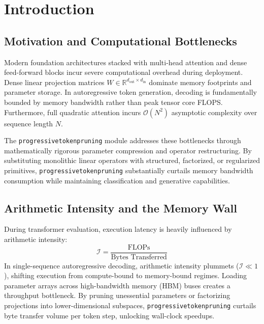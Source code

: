 \section{Introduction}

\subsection{Motivation and Computational Bottlenecks}
Modern foundation architectures stacked with multi-head attention and dense feed-forward blocks incur severe computational overhead during deployment. Dense linear projection matrices $W \in \mathbb{R}^{d_{\text{out}} \times d_{\text{in}}}$ dominate memory footprints and parameter storage. In autoregressive token generation, decoding is fundamentally bounded by memory bandwidth rather than peak tensor core FLOPS. Furthermore, full quadratic attention incurs $\mathcal{O}(N^2)$ asymptotic complexity over sequence length $N$.

The \texttt{progressivetokenpruning} module addresses these bottlenecks through mathematically rigorous parameter compression and operator restructuring. By substituting monolithic linear operators with structured, factorized, or regularized primitives, \texttt{progressivetokenpruning} substantially curtails memory bandwidth consumption while maintaining classification and generative capabilities.

\subsection{Arithmetic Intensity and the Memory Wall}
During transformer evaluation, execution latency is heavily influenced by arithmetic intensity:
\[
\mathcal{I} = \frac{\text{FLOPs}}{\text{Bytes Transferred}}
\]
In single-sequence autoregressive decoding, arithmetic intensity plummets ($\mathcal{I} \ll 1$), shifting execution from compute-bound to memory-bound regimes. Loading parameter arrays across high-bandwidth memory (HBM) buses creates a throughput bottleneck. By pruning unessential parameters or factorizing projections into lower-dimensional subspaces, \texttt{progressivetokenpruning} curtails byte transfer volume per token step, unlocking wall-clock speedups.

